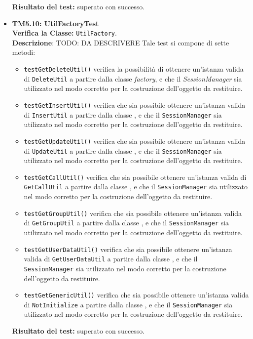 \begin{itemize}
\begin{itemize}
\end{itemize}
\textbf{Risultato del test:} superato con successo.





\item \textbf{TM5.10: UtilFactoryTest}\\
\textbf{Verifica la Classe:} \texttt{UtilFactory}.\\
\textbf{Descrizione}: TODO: DA DESCRIVERE
Tale test si compone di sette metodi:
\begin{itemize}
\item \texttt{testGetDeleteUtil()} verifica la possibilità di ottenere un'istanza valida di \texttt{DeleteUtil} a partire dalla classe \textit{factory}, e che il \textit{SessionManager} sia utilizzato nel modo corretto per la costruzione dell'oggetto da restituire.

\item \texttt{testGetInsertUtil()} verifica che sia possibile ottenere un'istanza valida di \texttt{InsertUtil} a partire dalla classe , e che il \texttt{SessionManager} sia utilizzato nel modo corretto per la costruzione dell'oggetto da restituire.

\item \texttt{testGetUpdateUtil()} verifica che sia possibile ottenere un'istanza valida di \texttt{UpdateUtil} a partire dalla classe , e che il \texttt{SessionManager} sia utilizzato nel modo corretto per la costruzione dell'oggetto da restituire.

\item \texttt{testGetCallUtil()} verifica che sia possibile ottenere un'istanza valida di \texttt{GetCallUtil} a partire dalla classe , e che il \texttt{SessionManager} sia utilizzato nel modo corretto per la costruzione dell'oggetto da restituire.

\item \texttt{testGetGroupUtil()} verifica che sia possibile ottenere un'istanza valida di \texttt{GetGroupUtil} a partire dalla classe , e che il \texttt{SessionManager} sia utilizzato nel modo corretto per la costruzione dell'oggetto da restituire.

\item \texttt{testGetUserDataUtil()} verifica che sia possibile ottenere un'istanza valida di \texttt{GetUserDataUtil} a partire dalla classe , e che il \texttt{SessionManager} sia utilizzato nel modo corretto per la costruzione dell'oggetto da restituire.

\item \texttt{testGetGenericUtil()} verifica che sia possibile ottenere un'istanza valida di \texttt{NotInitialize} a partire dalla classe , e che il \texttt{SessionManager} sia utilizzato nel modo corretto per la costruzione dell'oggetto da restituire.

\end{itemize}
\textbf{Risultato del test:} superato con successo.

\end{itemize}



